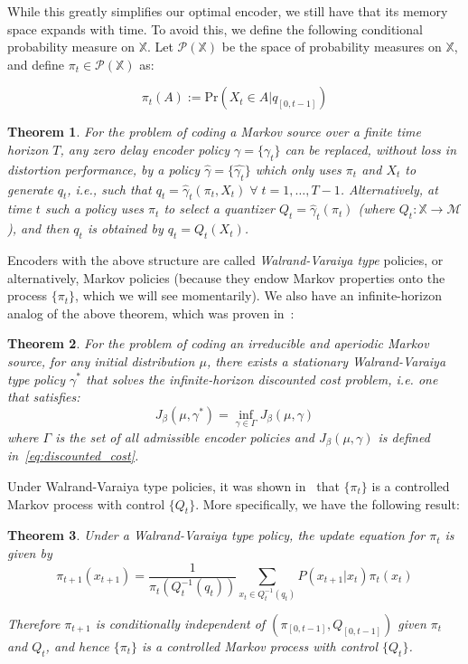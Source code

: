 \documentclass{article}
\newtheorem{theorem}{Theorem}[section]
\begin{document}
While this greatly simplifies our optimal encoder, we still have that its memory space expands with time. To avoid this, we define the following conditional probability measure on \(\mathbb{X}\). Let \(\mathcal{P}(\mathbb{X})\) be the space of probability measures on \(\mathbb{X}\), and define \(\pi_t \in \mathcal{P}(\mathbb{X})\) as:

\[\pi_t(A) := \text{Pr}(X_t \in A | q_{[0,t-1]})\]

\begin{theorem}\label{theorem:Walrand}\cite{Walrand}
    For the problem of coding a Markov source over a finite time horizon \(T\), any zero delay encoder policy \(\gamma=\{\gamma_t\}\) can be replaced, without loss in distortion performance, by a policy \(\hat{\gamma}=\{\hat{\gamma_t}\}\) which only uses \(\pi_t\) and \(X_t\) to generate \(q_t\), i.e., such that \(q_t = \hat{\gamma}_t(\pi_t, X_t) \; \forall \; t = 1,\ldots,T-1\). Alternatively, at time \(t\) such a policy uses \(\pi_t\) to select a quantizer \(Q_t = \hat{\gamma}_t(\pi_t)\) (where \(Q_t : \mathbb{X} \to \mathcal{M}\)), and then \(q_t\) is obtained by \(q_t = Q_t(X_t)\).
\end{theorem}

Encoders with the above structure are called \emph{Walrand-Varaiya type} policies, or alternatively, Markov policies (because they endow Markov properties onto the process \(\{\pi_t\}\), which we will see momentarily). We also have an infinite-horizon analog of the above theorem, which was proven in~\cite{Wood}:

\begin{theorem}\label{theorem:Wood}\cite[Proposition 2]{Wood}
    For the problem of coding an irreducible and aperiodic Markov source, for any initial distribution \(\mu\), there exists a stationary Walrand-Varaiya type policy \(\gamma^*\) that solves the infinite-horizon discounted cost problem, i.e. one that satisfies:
    \[J_\beta(\mu,\gamma^*) = \inf_{\gamma \in \Gamma}J_\beta(\mu,\gamma)\]
    where \(\Gamma\) is the set of all admissible encoder policies and \(J_\beta(\mu,\gamma)\) is defined in~\eqref{eq:discounted_cost}.
\end{theorem}

Under Walrand-Varaiya type policies, it was shown in~\cite{Linder} that \( \{\pi_t\} \) is a controlled Markov process with control \( \{Q_t\} \). More specifically, we have the following result:

\begin{theorem}\cite{Linder}
    Under a Walrand-Varaiya type policy, the update equation for \(\pi_t\) is given by
    \begin{equation}
        \pi_{t+1}(x_{t+1}) = \frac{1}{\pi_t(Q_t^{-1}(q_t))}\sum_{x_t \in Q_t^{-1}(q_t)}P(x_{t+1}|x_t)\pi_t(x_t)\label{eq:1}
    \end{equation}

    Therefore \( \pi_{t+1} \) is conditionally independent of \( (\pi_{[0,t-1]}, Q_{[0,t-1]}) \) given \( \pi_t \) and \( Q_t \), and hence \( \{\pi_t\} \) is a controlled Markov process with control \( \{Q_t\} \).
\end{theorem}
\end{document}
